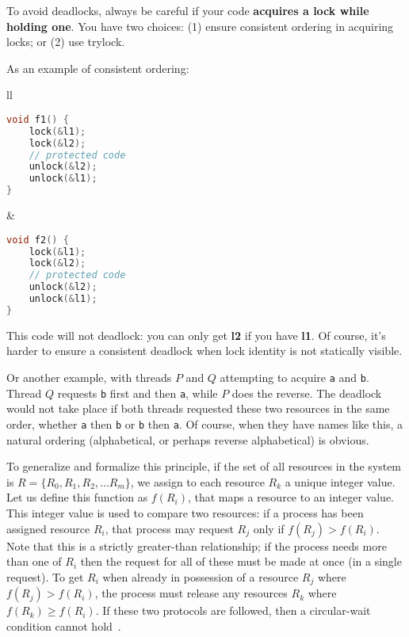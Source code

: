 To avoid deadlocks, always be careful if your code {\bf acquires a
  lock while holding one}.  You have two choices: (1) ensure
consistent ordering in acquiring locks; or (2) use trylock.

As an example of consistent ordering:
\begin{center}
\begin{tabular}{ll}
\begin{minipage}{.4\textwidth}
  \begin{lstlisting}[language=C]
void f1() {
    lock(&l1);
    lock(&l2);
    // protected code
    unlock(&l2);
    unlock(&l1);    
}
\end{lstlisting}
\end{minipage}&
\begin{minipage}{.4\textwidth}
\begin{lstlisting}[language=C]
void f2() {
    lock(&l1);
    lock(&l2);
    // protected code
    unlock(&l2);
    unlock(&l1);    
}
  \end{lstlisting}
\end{minipage}
\end{tabular}
\end{center}
This code will not deadlock: you can only get {\bf l2} if you have
{\bf l1}. Of course, it's harder to ensure a consistent deadlock when lock
identity is not statically visible.

Or another example, with threads $P$ and $Q$ attempting to acquire \texttt{a} and \texttt{b}. Thread $Q$ requests \texttt{b} first and then \texttt{a}, while $P$ does the reverse. The deadlock would not take place if both threads requested these two resources in the same order, whether \texttt{a} then \texttt{b} or \texttt{b} then \texttt{a}. Of course, when they have names like this, a natural ordering (alphabetical, or perhaps reverse alphabetical) is obvious. 

To generalize and formalize this principle, if the set of all resources in the system is $R = \{R_{0}, R_{1}, R_{2}, ... R_{m}\}$, we assign to each resource $R_{k}$ a unique integer value. Let us define this function as $f(R_{i})$, that maps a resource to an integer value. This integer value is used to compare two resources: if a process has been assigned resource $R_{i}$, that process may request $R_{j}$ only if $f(R_{j}) > f(R_{i})$. Note that this is a strictly greater-than relationship; if the process needs more than one of $R_{i}$ then the request for all of these must be made at once (in a single request). To get $R_{i}$ when already in possession of a resource $R_{j}$ where $f(R_{j}) > f(R_{i})$, the process must release any resources $R_{k}$ where $f(R_{k}) \geq f(R_{i})$. If these two protocols are followed, then a circular-wait condition cannot hold~\cite{osc}.


